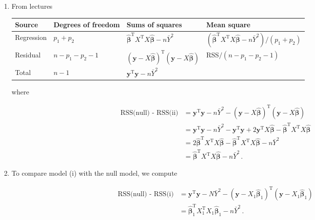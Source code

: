 \documentclass[
]{book}
\theoremstyle{definition}
\theoremstyle{definition}
\theoremstyle{definition}
\theoremstyle{definition}
\theoremstyle{remark}
\begin{document}
\begin{enumerate}
\def\labelenumi{\alph{enumi}.}
\item
  From lectures

  \begin{longtable}[]{@{}
    >{\raggedright\arraybackslash}p{}
    >{\centering\arraybackslash}p{}
    >{\centering\arraybackslash}p{}
    >{\centering\arraybackslash}p{}@{}}
  \toprule
  Source & Degrees of freedom & Sums of squares & Mean square \\
  \midrule
  \endhead
  Regression & \(p_1+p_2\) & \(\hat{\boldsymbol{\beta}}^{\mathrm{T}}X^{\mathrm{T}}X\hat{\boldsymbol{\beta}} - n\bar{Y}^2\) & \(\left(\hat{\boldsymbol{\beta}}^{\mathrm{T}}X^{\mathrm{T}}X\hat{\boldsymbol{\beta}} - n\bar{Y}^2\right)/(p_1+p_2)\) \\
  Residual & \(n-p_1-p_2-1\) & \((\boldsymbol{y}- X\hat{\boldsymbol{\beta}})^{\mathrm{T}}(\boldsymbol{y}- X\hat{\boldsymbol{\beta}})\) & RSS\(/(n-p_1-p_2-1)\) \\
  Total & \(n-1\) & \(\boldsymbol{y}^{\mathrm{T}}\boldsymbol{y}- n\bar{Y}^2\) & \\
  \bottomrule
  \end{longtable}

  where

  \begin{align*}
  \mbox{RSS(null) - RSS(ii)} & = \boldsymbol{y}^{\mathrm{T}}\boldsymbol{y}- n\bar{Y}^2 - (\boldsymbol{y}- X\hat{\boldsymbol{\beta}})^{\mathrm{T}}(\boldsymbol{y}- X\hat{\boldsymbol{\beta}})\\
  & = \boldsymbol{y}^{\mathrm{T}}\boldsymbol{y}- n\bar{Y}^2 - \boldsymbol{y}^{\mathrm{T}}\boldsymbol{y}+ 2\boldsymbol{y}^{\mathrm{T}}X\hat{\boldsymbol{\beta}} - \hat{\boldsymbol{\beta}}^{\mathrm{T}}X^{\mathrm{T}}X\hat{\boldsymbol{\beta}}\\
  & = 2\hat{\boldsymbol{\beta}}^{\mathrm{T}}X^{\mathrm{T}}X\hat{\boldsymbol{\beta}} - \hat{\boldsymbol{\beta}}^{\mathrm{T}}X^{\mathrm{T}}X\hat{\boldsymbol{\beta}} - n\bar{Y}^2\\
  & = \hat{\boldsymbol{\beta}}^{\mathrm{T}}X^{\mathrm{T}}X\hat{\boldsymbol{\beta}} - n\bar{Y}^2\,.
   \end{align*}
\item
  To compare model (i) with the null model, we compute

  \begin{align*}
   \mbox{RSS(null) - RSS(i)} & = \boldsymbol{y}^{\mathrm{T}}\boldsymbol{y}- N\bar{Y}^2 - (\boldsymbol{y}- X_1\hat{\boldsymbol{\beta}}_1)^{\mathrm{T}}(\boldsymbol{y}- X_1\hat{\boldsymbol{\beta}}_1)\\
   & = \hat{\boldsymbol{\beta}}_1^{\mathrm{T}}X_1^{\mathrm{T}}X_1\hat{\boldsymbol{\beta}}_1 - n\bar{Y}^2\,.
   \end{align*}


\end{enumerate}
\end{document}
